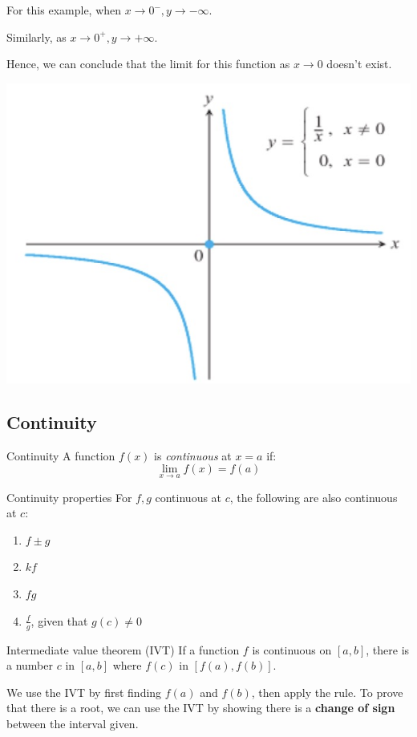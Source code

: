 \begin{minipage}{0.65\textwidth}
    For this example, when $x\to 0^-, y\to -\infty$.

    Similarly, as $x\to 0^+, y\to +\infty$.

    Hence, we can conclude that the limit for this function as $x\to 0$ doesn't exist.
\end{minipage}
\hfill
\begin{minipage}{0.25\textwidth}
    \includegraphics[width=\textwidth]{img/lim3.jpg}
\end{minipage}

\subsection{Continuity}
\begin{definition}
    {Continuity}
    A function $f(x)$ is \emph{continuous} at $x=a$ if:
    \[\mathop {\lim }\limits_{x \to a} f\left( x \right) = f\left( a \right)\]
\end{definition}
\begin{knBox}
    {Continuity properties}
    For $f,g$ continuous at $c$, the following are also continuous at $c$:
    \begin{enumerate}
        \item $f \pm g$
        \item $kf$
        \item $fg$
        \item $\frac{f}{g}$, given that $g(c)\ne 0$
    \end{enumerate}
\end{knBox}
\begin{theorem}
    {Intermediate value theorem (IVT)}
    If a function $f$ is continuous on $[a, b]$, there is a number $c$ in $[a, b]$ where $f(c)$ in $[f(a), f(b)]$.

    We use the IVT by first finding $f(a)$ and $f(b)$, then apply the rule.
    \tcblower
    To prove that there is a root, we can use the IVT by showing there is a \textbf{change of sign} between the interval given.
\end{theorem}

